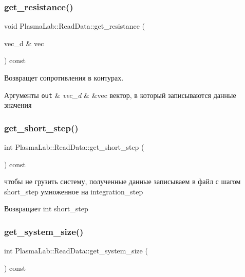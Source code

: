 \subsubsection{\texorpdfstring{get\+\_\+resistance()}{get\_resistance()}}
{\footnotesize\ttfamily void Plasma\+Lab\+::\+Read\+Data\+::get\+\_\+resistance (\begin{DoxyParamCaption}\item[{vec\+\_\+d \&}]{vec }\end{DoxyParamCaption}) const\hspace{0.3cm}{\ttfamily [inline]}}

Возвращет сопротивления в контурах. 
\begin{DoxyParams}[1]{Аргументы}
\mbox{\tt out}  & {\em vec\+\_\+d} & \&vec вектор, в который записываются данные значения \\
\hline
\end{DoxyParams}
\mbox{\label{class_plasma_lab_1_1_read_data_aa5f9a888c78b78ae8548f74db9cc14f8}} 
\subsubsection{\texorpdfstring{get\+\_\+short\+\_\+step()}{get\_short\_step()}}
{\footnotesize\ttfamily int Plasma\+Lab\+::\+Read\+Data\+::get\+\_\+short\+\_\+step (\begin{DoxyParamCaption}{ }\end{DoxyParamCaption}) const\hspace{0.3cm}{\ttfamily [inline]}}

чтобы не грузить систему, полученные данные записываем в файл с шагом short\+\_\+step умноженное на integration\+\_\+step \begin{DoxyReturn}{Возвращает}
int short\+\_\+step 
\end{DoxyReturn}
\mbox{\label{class_plasma_lab_1_1_read_data_a4eedaa982a0fff4fd3b743d740cdbfd2}} 
\subsubsection{\texorpdfstring{get\+\_\+system\+\_\+size()}{get\_system\_size()}}
{\footnotesize\ttfamily int Plasma\+Lab\+::\+Read\+Data\+::get\+\_\+system\+\_\+size (\begin{DoxyParamCaption}{ }\end{DoxyParamCaption}) const\hspace{0.3cm}{\ttfamily [inline]}}

